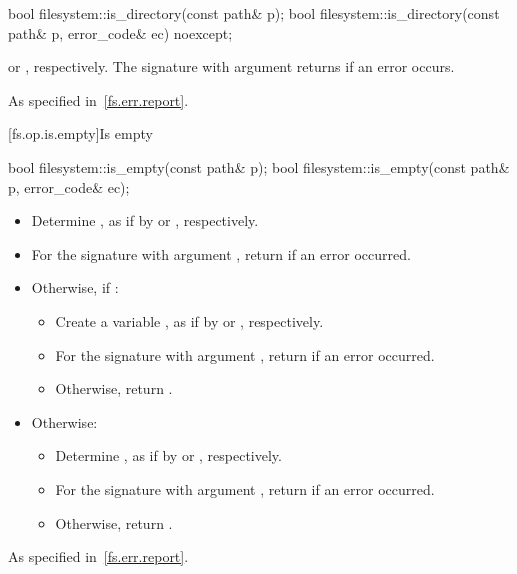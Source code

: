 %
\begin{itemdecl}
bool filesystem::is_directory(const path& p);
bool filesystem::is_directory(const path& p, error_code& ec) noexcept;
\end{itemdecl}

\begin{itemdescr}
\pnum
\returns
{} or ,
  respectively. The signature with argument
   returns  if an error occurs.

\pnum
\throws
As specified in~\ref{fs.err.report}.
\end{itemdescr}


[fs.op.is.empty]{Is empty}

%
\begin{itemdecl}
bool filesystem::is_empty(const path& p);
bool filesystem::is_empty(const path& p, error_code& ec);
\end{itemdecl}

\begin{itemdescr}
\pnum
\effects
\begin{itemize}
\item Determine ,
   as if by  or , respectively.
\item For the signature with argument ,
   return  if an error occurred.
\item Otherwise, if :
  \begin{itemize}
  \item Create a variable ,
     as if by  or
     , respectively.
  \item For the signature with argument ,
     return  if an error occurred.
  \item Otherwise, return .
  \end{itemize}
\item
Otherwise:
  \begin{itemize}
  \item Determine ,
    as if by  or , respectively.
  \item For the signature with argument ,
    return  if an error occurred.
  \item Otherwise, return .
  \end{itemize}
\end{itemize}

\pnum
\throws
As specified in~\ref{fs.err.report}.
\end{itemdescr}


